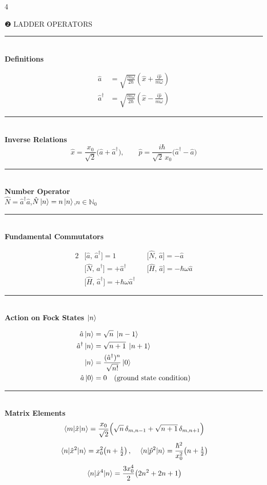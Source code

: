 \documentclass[9pt,landscape]{article}
\newcommand{\A}{\hat{a}}
\newcommand{\Ad}{\hat{a}^{\dagger}}
\newcommand{\N}{\hat{N}}
\newcommand{\x}{\hat{x}}
\newcommand{\p}{\hat{p}}
\newcommand{\H}{\hat{H}}
\newcommand{\xz}{x_0}                     %
\newcommand{\half}{\tfrac{1}{2}}
\newcommand{\mysec}[1]{%
  \vspace{3pt}%
  {\color{midviolet}\rule{\linewidth}{0.6pt}}\\[-1pt]%
  {\bfseries\color{deepviolet}\small #1}\\[0.5pt]%
}
\begin{document}
\begin{multicols}{4}
\begin{tcolorbox}[sectionbox]
  \centering ❷\; LADDER OPERATORS
\end{tcolorbox}

\mysec{Definitions}
\begin{tcolorbox}[keybox]
\begin{align*}
  \A  &= \sqrt{\frac{m\omega}{2\hbar}}\!\left(\x + \frac{i\p}{m\omega}\right)\\[4pt]
  \Ad &= \sqrt{\frac{m\omega}{2\hbar}}\!\left(\x - \frac{i\p}{m\omega}\right)
\end{align*}
\end{tcolorbox}

\mysec{Inverse Relations}
\[
  \x = \frac{\xz}{\sqrt{2}}\bigl(\A+\Ad\bigr),\qquad
  \p = \frac{i\hbar}{\sqrt{2}\,\xz}\bigl(\Ad-\A\bigr)
\]

\mysec{Number Operator}
$\N = \Ad\A$,\quad $\N\ket{n}=n\ket{n}$,\quad $n\in\mathbb{N}_0$

\mysec{Fundamental Commutators}
\begin{tcolorbox}[keybox]
\begin{alignat*}{2}
  &\bigl[\A,\,\Ad\bigr] = 1 \quad &
  &\bigl[\N,\,\A\bigr] = -\A \\
  &\bigl[\N,\,\Ad\bigr] = +\Ad \quad &
  &\bigl[\H,\,\A\bigr] = -\hbar\omega\A \\
  &\bigl[\H,\,\Ad\bigr] = +\hbar\omega\Ad
\end{alignat*}
\end{tcolorbox}

\mysec{Action on Fock States $\ket{n}$}
\begin{tcolorbox}[keybox]
\begin{align*}
  \A\ket{n}  &= \sqrt{n}\;\ket{n-1} \\
  \Ad\ket{n} &= \sqrt{n+1}\;\ket{n+1} \\
  \ket{n}    &= \frac{(\Ad)^n}{\sqrt{n!}}\ket{0} \\
  \A\ket{0}  &= 0 \quad\text{(ground state condition)}
\end{align*}
\end{tcolorbox}

\mysec{Matrix Elements}
\[
  \mel{m}{\x}{n} = \frac{\xz}{\sqrt{2}}\Bigl(\sqrt{n}\,\delta_{m,n-1}+\sqrt{n+1}\,\delta_{m,n+1}\Bigr)
\]
\[
  \mel{n}{\x^2}{n} = \xz^2\!\left(n+\half\right),\quad
  \mel{n}{\p^2}{n} = \frac{\hbar^2}{\xz^2}\!\left(n+\half\right)
\]
\[
  \mel{n}{\x^4}{n} = \frac{3\xz^4}{2}\!\left(2n^2+2n+1\right)
\]



\end{multicols}
\end{document}
